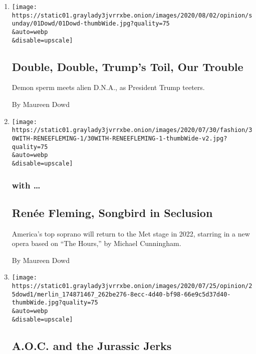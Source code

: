 \begin{enumerate}
\def\labelenumi{\arabic{enumi}.}
\item
  \href{/2020/08/01/opinion/sunday/trump-coronavirus-herman-cain.html}{}

  \texttt{[image: https://static01.graylady3jvrrxbe.onion/images/2020/08/02/opinion/sunday/01Dowd/01Dowd-thumbWide.jpg?quality=75\\\&auto=webp\\\&disable=upscale]}

  \hypertarget{double-double-trumps-toil-our-trouble}{%
  \subsection{Double, Double, Trump's Toil, Our
  Trouble}\label{double-double-trumps-toil-our-trouble}}

  Demon sperm meets alien D.N.A., as President Trump teeters.

  By Maureen Dowd
\item
  \href{/2020/07/30/style/maureen-dowd-renee-fleming.html}{}

  \texttt{[image: https://static01.graylady3jvrrxbe.onion/images/2020/07/30/fashion/30WITH-RENEEFLEMING-1/30WITH-RENEEFLEMING-1-thumbWide-v2.jpg?quality=75\\\&auto=webp\\\&disable=upscale]}

  \hypertarget{with-}{%
  \subsubsection{with \ldots{}}\label{with-}}

  \hypertarget{renuxe9e-fleming-songbird-in-seclusion}{%
  \subsection{Renée Fleming, Songbird in
  Seclusion}\label{renuxe9e-fleming-songbird-in-seclusion}}

  America's top soprano will return to the Met stage in 2022, starring
  in a new opera based on ``The Hours,'' by Michael Cunningham.

  By Maureen Dowd
\item
  \href{/2020/07/25/opinion/sunday/aoc-yoho-trump-2020.html}{}

  \texttt{[image: https://static01.graylady3jvrrxbe.onion/images/2020/07/25/opinion/25dowd1/merlin\_174871467\_262be276-8ecc-4d40-bf98-66e9c5d37d40-thumbWide.jpg?quality=75\\\&auto=webp\\\&disable=upscale]}

  \hypertarget{aoc-and-the-jurassic-jerks}{%
  \subsection{A.O.C. and the Jurassic
  Jerks}\label{aoc-and-the-jurassic-jerks}}


\end{enumerate}
